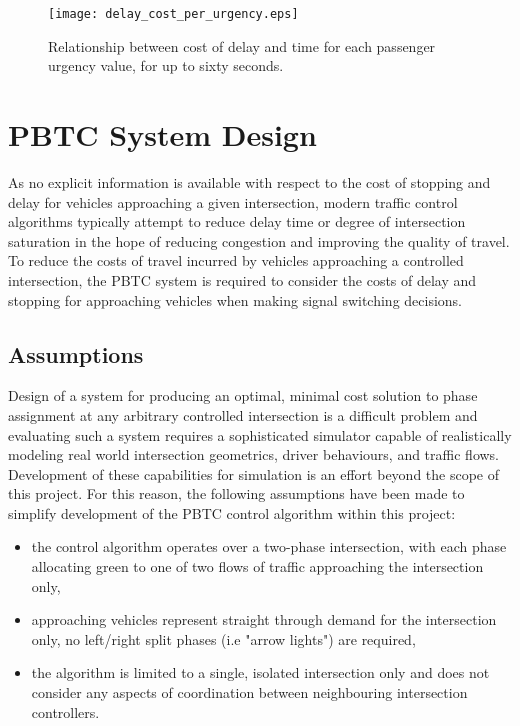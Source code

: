
\begin{figure}[]
\centering
	\texttt{[image: delay\_cost\_per\_urgency.eps]}
	\caption{Relationship between cost of delay and time for each passenger urgency value, for up to sixty seconds. }
\label{delaycosturgency}
\end{figure}

\section{PBTC System Design}
 
As no explicit information is available with respect to the cost of stopping and delay for vehicles approaching a given intersection, modern traffic control algorithms typically attempt to reduce delay time or degree of intersection saturation in the hope of reducing congestion and improving the quality of travel. To reduce the costs of travel incurred by vehicles approaching a controlled intersection, the PBTC system is required to consider the costs of delay and stopping for approaching vehicles when making signal switching decisions.

\subsection{Assumptions}

Design of a system for producing an optimal, minimal cost solution to phase assignment at any arbitrary controlled intersection is a difficult problem and evaluating such a system requires a sophisticated simulator capable of realistically modeling real world intersection geometrics, driver behaviours, and traffic flows. Development of these capabilities for simulation is an effort beyond the scope of this project. For this reason, the following assumptions have been made to simplify development of the PBTC control algorithm within this project:

\begin{itemize}
\item the control algorithm operates over a two-phase intersection, with each phase allocating green to one of two flows of traffic approaching the intersection only,
\item approaching vehicles represent straight through demand for the intersection only, no left/right split phases (i.e "arrow lights") are required,
\item the algorithm is limited to a single, isolated intersection only and does not consider any aspects of coordination between neighbouring intersection controllers.
\end{itemize}

